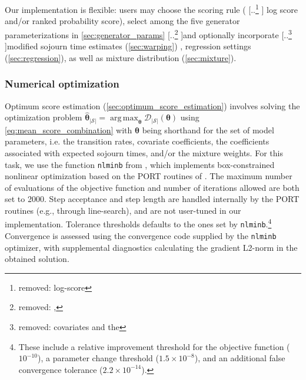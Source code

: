 \documentclass{article}
\DeclareMathOperator*{\argmax}{arg\,max}
\providecommand{\DIFadd}[1]{{\protect\color{blue} \sf #1}} %
\providecommand{\DIFdel}[1]{{\protect\color{red} [..\footnote{removed: #1} ]}} %
\providecommand{\DIFaddbegin}{} %
\providecommand{\DIFaddend}{} %
\providecommand{\DIFdelbegin}{} %
\providecommand{\DIFdelend}{} %
\begin{document}
Our implementation is flexible: users may choose the scoring rule (\DIFdelbegin \DIFdel{log-score }\DIFdelend \DIFaddbegin \DIFadd{log score }\DIFaddend and/or ranked probability score), select among the five generator parameterizations in \cref{sec:generator_params} \DIFdelbegin \DIFdel{, }\DIFdelend and optionally incorporate \DIFdelbegin \DIFdel{covariates and the }\DIFdelend modified sojourn time estimates (\cref{sec:warping})\DIFaddbegin \DIFadd{, regression settings (\cref{sec:regression}), as well as mixture distribution (\cref{sec:mixture})}\DIFaddend .

\DIFaddbegin \subsubsection{\DIFadd{Numerical optimization}} 
\DIFadd{Optimum score estimation (\cref{sec:optimum_score_estimation}) involves solving the optimization problem $\widehat{\bm{\theta}}_{|\mathcal{S}|} = \argmax_{\bm{\theta}}\mathcal{D}_{|\mathcal{S}|}(\bm{\theta})$ using \cref{eq:mean_score_combination} with $\bm{\theta}$ being shorthand for the set of model parameters, i.e. the transition rates, covariate coefficients, the coefficients associated with expected sojourn times, and/or the mixture weights.
For this task, we use the function \texttt{nlminb} from \citet{R_stats}, which implements box-constrained nonlinear optimization based on the PORT routines of \citet{Gay1990}. The maximum number of evaluations of the objective function and number of iterations allowed are both set to 2000.
Step acceptance and step length are handled internally by the PORT routines (e.g., through line-search), and are not user-tuned in our implementation.
Tolerance thresholds defaults to the ones set by \texttt{nlminb}.}\footnote{\DIFadd{These include a relative improvement threshold for the objective function ($10^{-10}$), a parameter change threshold ($1.5 \times 10^{-8}$), and an additional false convergence tolerance ($2.2\times 10^{-14}$).}}
\DIFadd{Convergence is assessed using the convergence code supplied by the \texttt{nlminb} optimizer, with supplemental diagnostics calculating the gradient L2-norm in the obtained solution.
}
\end{document}

